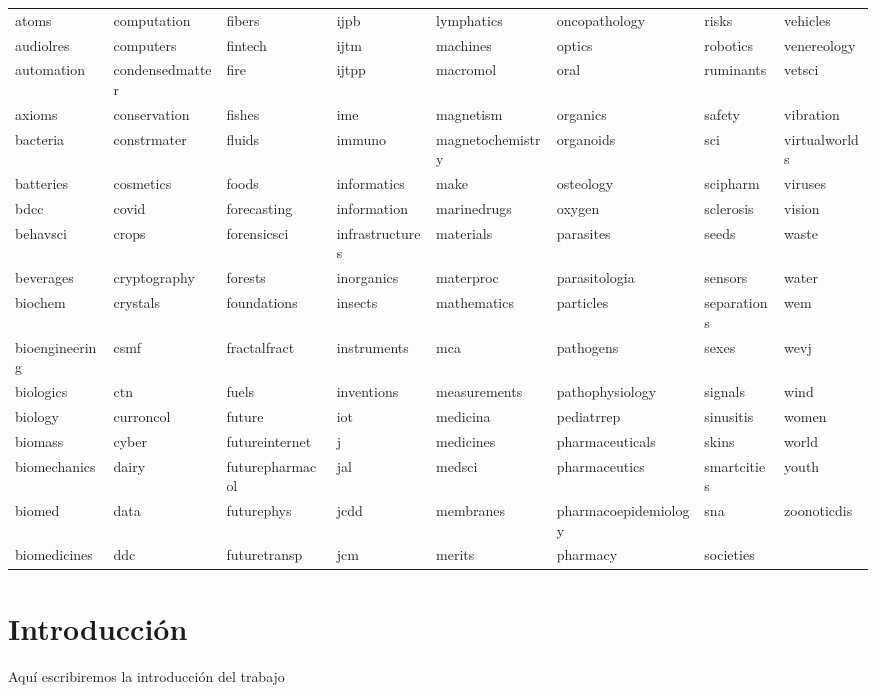 \documentclass[notspecified,article,submit,moreauthors,pdftex]{Definitions/mdpi}
\begin{document}
\begin{longtable}[t]{llllllll}
atoms & computation & fibers & ijpb & lymphatics & oncopathology & risks & vehicles\\
\addlinespace
audiolres & computers & fintech & ijtm & machines & optics & robotics & venereology\\
automation & condensedmatter & fire & ijtpp & macromol & oral & ruminants & vetsci\\
axioms & conservation & fishes & ime & magnetism & organics & safety & vibration\\
bacteria & constrmater & fluids & immuno & magnetochemistry & organoids & sci & virtualworlds\\
batteries & cosmetics & foods & informatics & make & osteology & scipharm & viruses\\
\addlinespace
bdcc & covid & forecasting & information & marinedrugs & oxygen & sclerosis & vision\\
behavsci & crops & forensicsci & infrastructures & materials & parasites & seeds & waste\\
beverages & cryptography & forests & inorganics & materproc & parasitologia & sensors & water\\
biochem & crystals & foundations & insects & mathematics & particles & separations & wem\\
bioengineering & csmf & fractalfract & instruments & mca & pathogens & sexes & wevj\\
\addlinespace
biologics & ctn & fuels & inventions & measurements & pathophysiology & signals & wind\\
biology & curroncol & future & iot & medicina & pediatrrep & sinusitis & women\\
biomass & cyber & futureinternet & j & medicines & pharmaceuticals & skins & world\\
biomechanics & dairy & futurepharmacol & jal & medsci & pharmaceutics & smartcities & youth\\
biomed & data & futurephys & jcdd & membranes & pharmacoepidemiology & sna & zoonoticdis\\
\addlinespace
biomedicines & ddc & futuretransp & jcm & merits & pharmacy & societies & \\
\bottomrule
\end{longtable}
\finishlandscape

\section{Introducción}\label{introducciuxf3n}

Aquí escribiremos la introducción del trabajo
\end{document}
